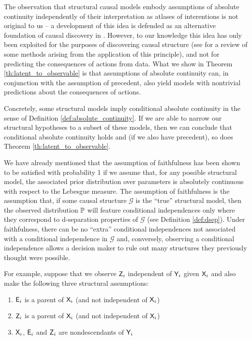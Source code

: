 The observation that structural causal models embody assumptions of absolute continuity independently of their interpretation as atlases of interentions is not original to us -- a development of this idea is defended as an alternative foundation of causal discovery in \citet{lemeire_replacing_2013}. However, to our knowledge this idea has only been exploited for the purposes of discovering causal structure (see \citet{peters_elements_2017} for a review of some methods arising from the application of this principle), and not for predicting the consequences of actions from data. What we show in Theorem \ref{th:latent_to_observable} is that assumptions of absolute continuity can, in conjunction with the assumption of precedent, also yield models with nontrivial predictions about the consequences of actions.

Concretely, some structural models imply conditional absolute continuity in the sense of Definition \ref{def:absolute_continuity}. If we are able to narrow our structural hypotheses to a subset of these models, then we can conclude that conditional absolute continuity holds and (if we also have precedent), so does Theorem \ref{th:latent_to_observable}.

We have already mentioned that the assumption of faithfulness has been shown to be satisfied with probability 1 if we assume that, for any possible structural model, the associated prior distribution over parameters is absolutely continuous with respect to the Lebesgue measure. The assumption of faithfulness is the assumption that, if some causal structure $\mathcal{G}$ is the ``true'' structural model, then the observed distribution $\mathbb{P}$ will feature conditional independences only where they correspond to d-separation properties of $\mathcal{G}$ (see Definition \ref{def:dsep}). Under faithfulness, there can be no ``extra'' conditional independences not associated with a conditional independence in $\mathcal{G}$ and, conversely, observing a conditional independence allows a decision maker to rule out many structures they previously thought were possible.

For example, suppose that we observe $\mathsf{Z}_i$ independent of $\mathsf{Y}_i$ given $\mathsf{X}_i$ and also make the following three structural assumptions:
\begin{enumerate}
    \item $\mathsf{E}_i$ is a parent of $\mathsf{X}_i$ (and not independent of $\mathsf{X}_i$)
    \item $\mathsf{Z}_i$ is a parent of $\mathsf{X}_i$ (and not independent of $\mathsf{X}_i$)
    \item $\mathsf{X}_i$, $\mathsf{E}_i$ and $\mathsf{Z}_i$ are nondescendants of $\mathsf{Y}_i$
\end{enumerate}

